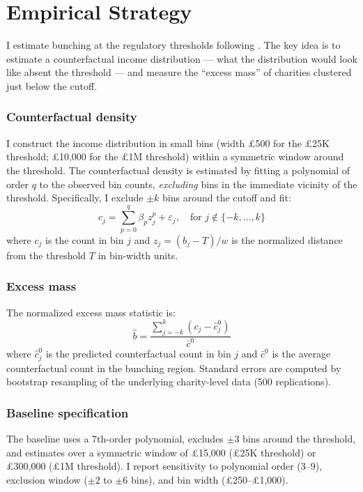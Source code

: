 \documentclass[12pt]{article}
\begin{document}



\section{Empirical Strategy}

I estimate bunching at the regulatory thresholds following \citet{klevenWaseem2013}. The key idea is to estimate a counterfactual income distribution --- what the distribution would look like absent the threshold --- and measure the ``excess mass'' of charities clustered just below the cutoff.

\subsubsection*{Counterfactual density} I construct the income distribution in small bins (width \pounds500 for the \pounds25K threshold; \pounds10,000 for the \pounds1M threshold) within a symmetric window around the threshold. The counterfactual density is estimated by fitting a polynomial of order $q$ to the observed bin counts, \emph{excluding} bins in the immediate vicinity of the threshold. Specifically, I exclude $\pm k$ bins around the cutoff and fit:
\begin{equation}
c_j = \sum_{p=0}^{q} \beta_p z_j^p + \varepsilon_j, \quad \text{for } j \notin \{-k, \ldots, k\}
\end{equation}
where $c_j$ is the count in bin $j$ and $z_j = (b_j - T)/w$ is the normalized distance from the threshold $T$ in bin-width units.

\subsubsection*{Excess mass} The normalized excess mass statistic is:
\begin{equation}
\hat{b} = \frac{\sum_{j=-k}^{k} (c_j - \hat{c}_j^0)}{\bar{c}^0}
\end{equation}
where $\hat{c}_j^0$ is the predicted counterfactual count in bin $j$ and $\bar{c}^0$ is the average counterfactual count in the bunching region. Standard errors are computed by bootstrap resampling of the underlying charity-level data (500 replications).

\subsubsection*{Baseline specification} The baseline uses a 7th-order polynomial, excludes $\pm 3$ bins around the threshold, and estimates over a symmetric window of \pounds15,000 (\pounds25K threshold) or \pounds300,000 (\pounds1M threshold). I report sensitivity to polynomial order (3--9), exclusion window ($\pm 2$ to $\pm 6$ bins), and bin width (\pounds250--\pounds1,000).
\end{document}
